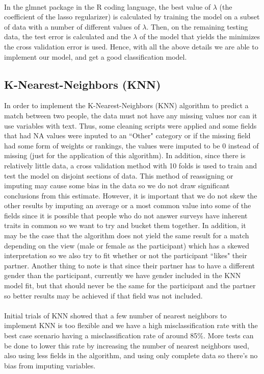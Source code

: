 \documentclass{article}
\begin{document}
\null\\
In the glmnet package in the R coding language, the best value of $\lambda$ (the coefficient of the lasso regularizer) is calculated by training the model on a subset of data with a number of different values of $\lambda$.  Then, on the remaining testing data, the test error is calculated and the $\lambda$ of the model that yields the minimizes the cross validation error is used. Hence, with all the above details we are able to implement our model, and get a good classification model.
%
\subsection{K-Nearest-Neighbors (KNN)}
In order to implement the K-Nearest-Neighbors (KNN) algorithm to predict a match between two people, the data must not have any missing values nor can it use variables with text.  Thus, some cleaning scripts were applied and some fields that had NA values were inputed to an ``Other" category or if the missing field had some form of weights or rankings, the values were imputed to be 0 instead of missing (just for the application of this algorithm).  In addition, since there is relatively little data, a cross validation method with 10 folds is used to train and test the model on disjoint sections of data.  This method of reassigning or imputing may cause some bias in the data so we do not draw significant conclusions from this estimate.  However, it is important that we do not skew the other results by imputing an average or a most common value into some of the fields since it is possible that people who do not answer surveys have inherent traits in common so we want to try and bucket them together.  In addition, it may be the case that the algorithm does not yield the same result for a match depending on the view (male or female as the participant) which has a skewed interpretation so we also try to fit whether or not the participant ``likes" their partner.  Another thing to note is that since their partner has to have a different gender than the participant, currently we have gender included in the KNN model fit, but that should never be the same for the participant and the partner so better results may be achieved if that field was not included.\\
\null\\
Initial trials of KNN showed that a few number of nearest neighbors to implement KNN is too flexible and we have a high misclassification rate with the best case scenario having a misclassification rate of around 85\%.  More tests can be done to lower this rate by increasing the number of nearest neighbors used, also using less fields in the algorithm, and using only complete data so there's no bias from imputing variables.
%
\end{document}
